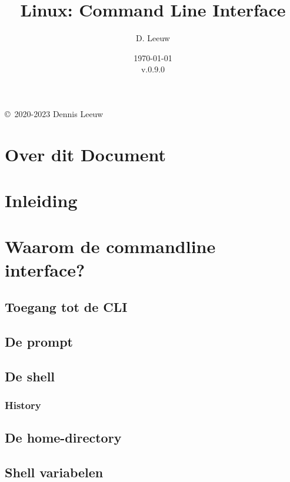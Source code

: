 \documentclass[a4paper,12pt,twoside,openright,titlepage]{book}
\author{D. Leeuw}
\title{Linux: Command Line Interface}
\date{\today\\v.0.9.0}
\begin{document}

\maketitle

\copyright\ 2020-2023 Dennis Leeuw\\




\frontmatter
\chapter{Over dit Document}



\tableofcontents

\mainmatter
\chapter{Inleiding}


\chapter{Waarom de commandline interface?}

\section{Toegang tot de CLI}

\section{De prompt}

\section{De shell}

\subsection{History}

\section{De home-directory}

\section{Shell variabelen}

\end{document}
